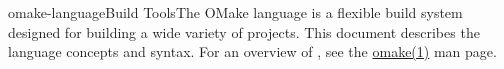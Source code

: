 %
%
%
\begin{Name}{1}{omake-language}{\authors}{Build Tools}{The OMake language}
   is a flexible build system designed for building a wide variety of projects.
  This document describes the language concepts and syntax.
  For an overview of , see the \href{omake.html}{omake(1)} man page.
\end{Name}

